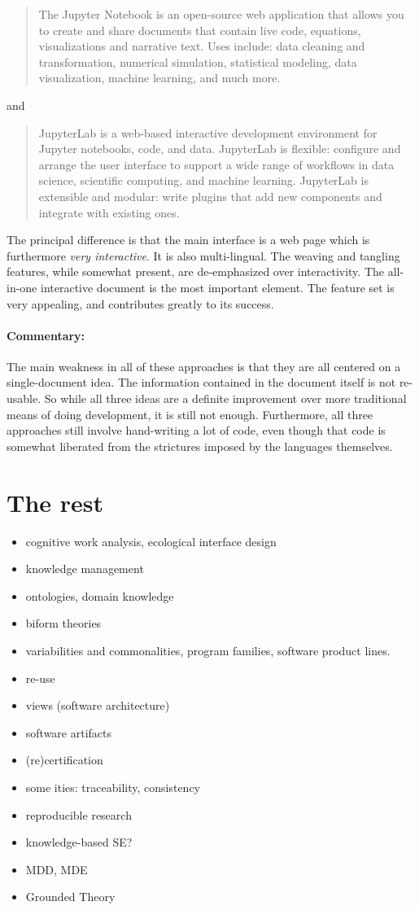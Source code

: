 \documentclass[sigconf,review]{acmart}
\begin{document}
\begin{quote}
The Jupyter Notebook is an open-source web application that allows you to
create and share documents that contain live code, equations, visualizations
and narrative text. Uses include: data cleaning and transformation, numerical
simulation, statistical modeling, data visualization, machine learning, and
much more.
\end{quote}
\noindent and
\begin{quote}
JupyterLab is a web-based interactive development environment for Jupyter
notebooks, code, and data. JupyterLab is flexible: configure and arrange the
user interface to support a wide range of workflows in data science, scientific
computing, and machine learning. JupyterLab is extensible and modular: write
plugins that add new components and integrate with existing ones.
\end{quote}
The principal difference is that the main interface is a web page
which is furthermore \emph{very interactive}. It is also multi-lingual.
The weaving and tangling features, while somewhat present, are de-emphasized
over interactivity. The all-in-one interactive document is the most
important element.  The feature set is very appealing, and contributes greatly
to its success.

\paragraph{Commentary:} The main weakness in all of these approaches is
that they are all centered on a single-document idea. The information
contained in the document itself is not re-usable. So while all three
ideas are a definite improvement over more traditional means of doing
development, it is still not enough. Furthermore, all three approaches
still involve hand-writing a lot of code, even though that code is
somewhat liberated from the strictures imposed by the languages themselves.

\section{The rest}
\begin{itemize}
\item cognitive work analysis, ecological interface design
\item knowledge management
\item ontologies, domain knowledge
\item biform theories
\item variabilities and commonalities, program families,
software product lines.
\item re-use
\item views (software architecture)
\item software artifacts
\item (re)certification
\item some ities: traceability, consistency
\item reproducible research
\item knowledge-based SE?
\item MDD, MDE
\item Grounded Theory
\end{itemize}
\end{document}

